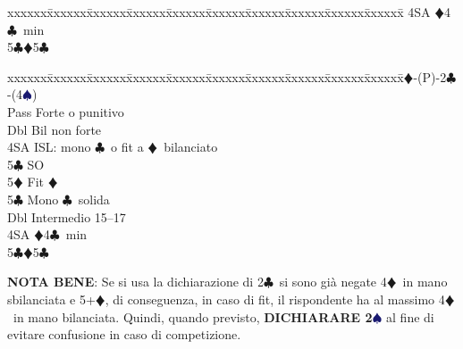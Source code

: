 \documentclass[a4paper,italian]{article}
\newcommand{\BC}{\textcolor{OliveGreen}{$\clubsuit$}}
\newcommand{\BD}{\textcolor{RedOrange}{$\vardiamondsuit$}}
\newcommand{\BS}{\textcolor{MidnightBlue}{$\spadesuit${}}}
\newenvironment{bidtable}
{\begin{tabbing}

    xxxxxx\=xxxxxx\=xxxxxx\=xxxxxx\=xxxxxx\=xxxxxx\=xxxxxx\=xxxxxx\=xxxxxx\=xxxxxx\=\kill}
{\end{tabbing} }%
\newenvironment{attenzione}[1]
{\begin{tcolorbox}[colframe=red!80!white,title=#1]}
    {
\end{tcolorbox} }%
\begin{document}
\begin{attenzione}{Interferenze}
\begin{bidtable}
                                            4SA \BD4\BC\ min\\
                                            5\BC {}\BD5\BC
                                        \end{bidtable}
                                        \smallbreak
                                        \begin{bidtable}
                                            1\BD-(P)-2\BC-(4\BS)\+\\
                                            Pass \> Forte o punitivo\+\\
                                            Dbl\> Bil non forte\\
                                            4SA\> ISL: mono \BC\ o fit a \BD\ bilanciato\+\\
                                            5\BC\> SO\+\\
                                            5\BD\> Fit \BD\-\-\\
                                            5\BC\> Mono \BC\ solida\-\\
                                            Dbl \> Intermedio 15--17\\
                                            4SA \BD4\BC\ min\\
                                            5\BC {}\BD5\BC\\
                                        \end{bidtable}

                                        \textbf{NOTA BENE}: Se si usa la dichiarazione di 2\BC\ si sono già negate 4\BD\ in mano sbilanciata e 5+\BD, di conseguenza, in caso di fit, il rispondente ha al massimo 4\BD\ in mano bilanciata. Quindi, quando previsto, \textbf{DICHIARARE 2\BS} al fine di evitare confusione in caso di competizione.
                                    \end{attenzione}
\end{document}
